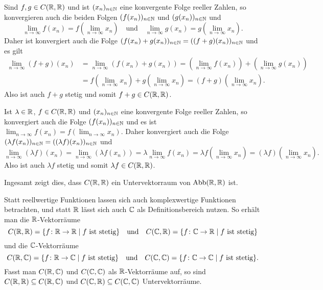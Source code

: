 Sind $f,g \in C(\mathbb{R},\mathbb{R})$ und ist $(x_n)_{n \in \mathbb{N}}$ eine konvergente Folge reeller Zahlen, so konvergieren auch die beiden Folgen $(f(x_n))_{n \in \mathbb{N}}$ und $(g(x_n))_{n \in \mathbb{N}}$ und
\[
 \lim_{n \to \infty} f(x_n) = f\left( \lim_{n \to \infty} x_n \right)
 \quad\text{und}\quad
 \lim_{n \to \infty} g(x_n) = g\left( \lim_{n \to \infty} x_n \right).
\]
Daher ist konvergiert auch die Folge $(f(x_n) + g(x_n))_{n \in \mathbb{N}} = ((f+g)(x_n))_{n \in \mathbb{N}}$ und es gilt
\begin{align*}
 \lim_{n \to \infty} (f+g)(x_n)
 &= \lim_{n \to \infty} (f(x_n) + g(x_n))
 = \left(\lim_{n \to \infty} f(x_n)\right) + \left(\lim_{n \to \infty} g(x_n)\right) \\
 &=f\left( \lim_{n \to \infty} x_n \right) + g\left( \lim_{n \to \infty} x_n \right)
 = (f+g)\left( \lim_{n \to \infty} x_n \right).
\end{align*}
Also ist auch $f+g$ stetig und somit $f+g \in C(\mathbb{R}, \mathbb{R})$.

Ist $\lambda \in \mathbb{R}$, $f \in C(\mathbb{R}, \mathbb{R})$ und $(x_n)_{n \in \mathbb{N}}$ eine konvergente Folge reeller Zahlen, so konvergiert auch die Folge $(f(x_n))_{n \in \mathbb{N}}$ und es ist $\lim_{n \to \infty} f(x_n) = f(\lim_{n \to \infty} x_n)$. Daher konvergiert auch die Folge $(\lambda f(x_n))_{n \in \mathbb{N}} = ((\lambda f)(x_n))_{n \in \mathbb{N}}$ und
\[
 \lim_{n \to \infty} (\lambda f)(x_n)
 = \lim_{n \to \infty}( \lambda f(x_n) )
 = \lambda \lim_{n \to \infty} f(x_n)
 = \lambda f\left( \lim_{n \to \infty} x_n \right)
 = (\lambda f) \left( \lim_{n \to \infty} x_n \right).
\]
Also ist auch $\lambda f$ stetig und somit $\lambda f \in C(\mathbb{R}, \mathbb{R})$.

Ingesamt zeigt dies, dass $C(\mathbb{R}, \mathbb{R})$ ein Untervektorraum von $\mathrm{Abb}(\mathbb{R}, \mathbb{R})$ ist.


\begin{bem}
 Statt reellwertige Funktionen lassen sich auch komplexwertige Funktionen betrachten, und statt $\mathbb{R}$ lässt sich auch $\mathbb{C}$ als Definitionsbereich nutzen. So erhält man die $\mathbb{R}$-Vektorräume
 \[
  C(\mathbb{R},\mathbb{R}) = \{f \colon \mathbb{R} \to \mathbb{R} \mid \text{$f$ ist stetig}\}
  \quad\text{und}\quad
  C(\mathbb{C},\mathbb{R}) = \{f \colon \mathbb{C} \to \mathbb{R} \mid \text{$f$ ist stetig}\}
 \]
 und die $\mathbb{C}$-Vektorräume
 \[
  C(\mathbb{R},\mathbb{C}) = \{f \colon \mathbb{R} \to \mathbb{C} \mid \text{$f$ ist stetig}\}
  \quad\text{und}\quad
  C(\mathbb{C},\mathbb{C}) = \{f \colon \mathbb{C} \to \mathbb{C} \mid \text{$f$ ist stetig}\}.
 \]
 Fasst man $C(\mathbb{R}, \mathbb{C})$ und $C(\mathbb{C}, \mathbb{C})$ als $\mathbb{R}$-Vektorräume auf, so sind $C(\mathbb{R}, \mathbb{R}) \subseteq C(\mathbb{R}, \mathbb{C})$ und $C(\mathbb{C}, \mathbb{R}) \subseteq C(\mathbb{C}, \mathbb{C})$ Untervektorräume.
\end{bem}



